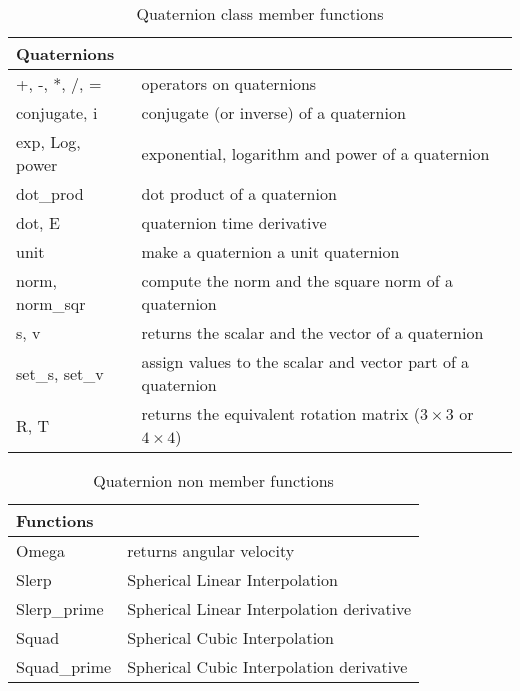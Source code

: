 \documentclass[11pt,fleqn,letterpaper]{report}
\begin{document}
\begin{table}[htbp]
\caption{Quaternion class member functions}
\label{tab:commandsumQuat}
\begin{center}
\begin{tabular}{||l|l||}
\hline
\hline
\multicolumn{2}{||l||}{{\bf Quaternions}} \\
\hline
\hline
+, -, *, /, = & operators on quaternions \\
\hline
conjugate, i  & conjugate (or inverse) of a quaternion \\
\hline
exp, Log, power & exponential, logarithm and power of a quaternion \\
\hline
dot\_prod & dot product of a quaternion \\
\hline
dot, E & quaternion time derivative\\
\hline
unit & make a quaternion a unit quaternion \\
\hline
norm, norm\_sqr & compute the norm and the square norm of a quaternion \\
\hline 
s, v & returns the scalar and the vector of a quaternion \\
\hline
set\_s, set\_v & assign values to the scalar and vector part of a quaternion \\
\hline
R, T  & returns the equivalent rotation matrix ($3 \times 3$ or $4 \times 4$) \\
\hline
\hline
\end{tabular}
\end{center}
\end{table}

\begin{table}[htbp]
\caption{Quaternion non member functions}
\label{tab:commandsumQuatnm}
\begin{center}
\begin{tabular}{||l|l||}
\hline
\hline
\multicolumn{2}{||l||}{{\bf Functions}} \\
\hline
\hline
Omega & returns angular velocity \\
\hline
Slerp  & Spherical Linear Interpolation \\
\hline
Slerp\_prime & Spherical Linear Interpolation derivative \\ 
\hline
Squad & Spherical Cubic Interpolation \\
\hline
Squad\_prime & Spherical Cubic Interpolation derivative \\
\hline
\hline 
\end{tabular}
\end{center}
\end{table}
\end{document}
